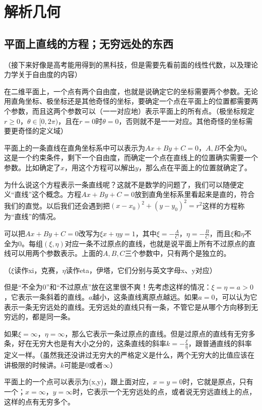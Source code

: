 \chapter{解析几何}
\section{平面上直线的方程；无穷远处的东西}
（接下来好像是高考能用得到的黑科技，但是需要先看前面的线性代数，以及理论力学关于自由度的内容）

在二维平面上，一个点有两个自由度，也就是说确定它的坐标需要两个参数。无论用直角坐标、极坐标还是其他奇怪的坐标，要确定一个点在平面上的位置都需要两个参数，而且这两个参数可以（一一对应地）表示平面上的所有点。（极坐标规定$r \ge 0$，$\theta \in [0,2 \pi)$，且在$r=0$时$\theta=0$，否则就不是一一对应。其他奇怪的坐标需要更奇怪的定义域）

平面上的一条直线在直角坐标系中可以表示为$A x+B y+C=0$，$A,B$不全为$0$。这是一个约束条件，剩下一个自由度，而确定一个点在直线上的位置确实需要一个参数。比如确定了$x$，用这个方程可以解出$y$，那么点在平面上的位置就确定了。

为什么说这个方程表示一条直线呢？这就不是数学的问题了，我们可以随便定义“直线”这个概念。方程$A x+B y+C=0$放到直角坐标系里看起来是直的，符合我们的直觉。以后我们还会遇到把$(x-x_0)^2+(y-y_0)^2=r^2$这样的方程称为“直线”的情况。

可以把$A x+B y+C=0$改写为$\xi x+\eta y=1$，其中$\xi=-\frac{A}{C}$，$\eta=-\frac{B}{C}$，而且$\xi$和$\eta$不全为$0$。每组$(\xi,\eta)$对应一条不过原点的直线，也就是说平面上所有不过原点的直线可以用两个参数表示。上面的$A,B,C$三个参数中，只有两个是独立的。

（$\xi$读作xi，克赛，$\eta$读作eta，伊塔，它们分别与英文字母x、y对应）

但是“不全为$0$”和“不过原点”放在这里很不爽！先考虑这样的情况：$\xi=\eta=a>0$，它表示一条斜着的直线。$a$越小，这条直线离原点越远。如果$a=0$，可以认为它表示一条无穷远处的直线。无穷远处的直线只有一条，不管它是从哪个方向移到无穷远的，都是同一条。

如果$\xi=\infty$，$\eta=\infty$，那么它表示一条过原点的直线。但是过原点的直线有无穷多条，好在无穷大也是有大小之分的，这条直线的斜率$k=-\frac{\xi}{\eta}$，跟普通直线的斜率定义一样。（虽然我还没讲过无穷大的严格定义是什么，两个无穷大的比值应该在讲极限的时候讲。$k$可能是$0$或者$\infty$）

平面上的一个点可以表示为(x,y)，跟上面对应，$x=y=0$时，它就是原点，只有一个；$x=\infty$，$y=\infty$时，它表示一个无穷远处的点，或者说无穷远直线上的点，这样的点有无穷多个。

